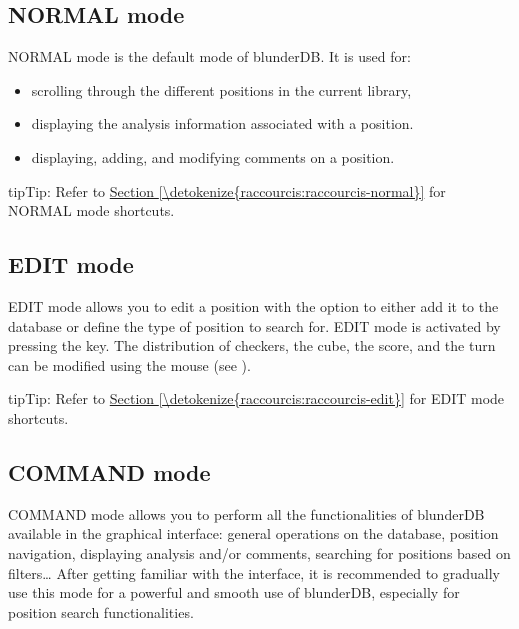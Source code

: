 \documentclass[letterpaper,10pt,english]{sphinxmanual}
\begin{document}
\subsection{NORMAL mode}
\label{\detokenize{manuel:le-mode-normal}}\label{\detokenize{manuel:mode-normal}}
\sphinxAtStartPar
NORMAL mode is the default mode of blunderDB. It is used for:
\begin{itemize}
\item {} 
\sphinxAtStartPar
scrolling through the different positions in the current library,

\item {} 
\sphinxAtStartPar
displaying the analysis information associated with a position.

\item {} 
\sphinxAtStartPar
displaying, adding, and modifying comments on a position.

\end{itemize}

\begin{sphinxadmonition}{tip}{Tip:}
\sphinxAtStartPar
Refer to \hyperref[\detokenize{raccourcis:raccourcis-normal}]{Section \ref{\detokenize{raccourcis:raccourcis-normal}}} for NORMAL mode shortcuts.
\end{sphinxadmonition}


\subsection{EDIT mode}
\label{\detokenize{manuel:le-mode-edit}}\label{\detokenize{manuel:mode-edit}}
\sphinxAtStartPar
EDIT mode allows you to edit a position with the option to either add it to the database or define the type of position to search for. EDIT mode is activated by pressing the  key. The distribution of checkers, the cube, the score, and the turn can be modified using the mouse (see {\hyperref[\detokenize{guide_utilisateur:guide-edit-position}]{}}).

\begin{sphinxadmonition}{tip}{Tip:}
\sphinxAtStartPar
Refer to \hyperref[\detokenize{raccourcis:raccourcis-edit}]{Section \ref{\detokenize{raccourcis:raccourcis-edit}}} for EDIT mode shortcuts.
\end{sphinxadmonition}


\subsection{COMMAND mode}
\label{\detokenize{manuel:le-mode-command}}\label{\detokenize{manuel:mode-command}}
\sphinxAtStartPar
COMMAND mode allows you to perform all the functionalities of blunderDB available in the graphical interface: general operations on the database, position navigation, displaying analysis and/or comments, searching for positions based on filters… After getting familiar with the interface, it is recommended to gradually use this mode for a powerful and smooth use of blunderDB, especially for position search functionalities.
\end{document}

